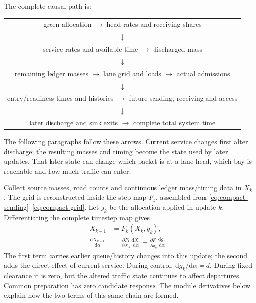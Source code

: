 \documentclass[10pt,a4paper]{article}
\newcommand{\rev}[1]{{\color{revisionred}#1}}
\begin{document}
The complete causal path is:
\begin{center}
\begin{tabular}{c}
green allocation $\longrightarrow$ head rates and receiving shares\\
$\downarrow$\\
\rev{service rates and available time $\longrightarrow$ discharged mass}\\
$\downarrow$\\
remaining ledger masses $\longrightarrow$ lane grid and loads
$\longrightarrow$ actual admissions\\
$\downarrow$\\
entry/readiness times and histories $\longrightarrow$ future sending,
receiving and access\\
$\downarrow$\\
later discharge and sink exits $\longrightarrow$ complete total system time
\end{tabular}
\end{center}
\rev{The following paragraphs follow these arrows.} Current service changes
first alter discharge; the resulting masses and timing become the state
used by later updates. That later state can change which packet is at a
lane head, which bay is reachable and how much traffic can enter.

Collect source masses, road counts and continuous ledger mass/timing data
in $X_k$. The grid is reconstructed inside the step map $F_k$, assembled
from \rev{\eqref{eq:compact-sending}}--\rev{\eqref{eq:compact-grid}}.
Let $g_k$ be the allocation applied in update $k$. Differentiating the
complete timestep map gives
\begin{equation}
 \begin{aligned}
 X_{k+1}&=F_k(X_k,g_k),\\
 \frac{\mathrm dX_{k+1}}{\mathrm d\alpha}
 &=\frac{\partial F_k}{\partial X_k}
       \frac{\mathrm dX_k}{\mathrm d\alpha}
  +\frac{\partial F_k}{\partial g_k}
       \frac{\mathrm dg_k}{\mathrm d\alpha}.
 \end{aligned}
 \label{eq:compact-chain}
\end{equation}
The first term carries earlier queue/history changes into this update;
the second adds the direct effect of current service. During control,
$\mathrm dg_k/\mathrm d\alpha=d$. During fixed clearance it is zero,
but the altered traffic state continues to affect departures.
Common preparation has zero candidate response. The module derivatives
below explain how the two terms of this same chain are formed.
\end{document}
